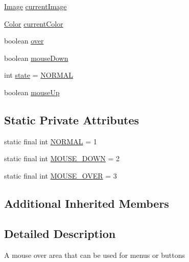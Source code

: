 \begin{DoxyCompactItemize}
\item 
\mbox{\hyperlink{classorg_1_1newdawn_1_1slick_1_1_image}{Image}} \mbox{\hyperlink{classorg_1_1newdawn_1_1slick_1_1gui_1_1_mouse_over_area_a4f8987c2e1bbc501ae63b3e8bd0d9777}{current\+Image}}
\item 
\mbox{\hyperlink{classorg_1_1newdawn_1_1slick_1_1_color}{Color}} \mbox{\hyperlink{classorg_1_1newdawn_1_1slick_1_1gui_1_1_mouse_over_area_a57b4335d9de8d2c3051689c9e0f69173}{current\+Color}}
\item 
boolean \mbox{\hyperlink{classorg_1_1newdawn_1_1slick_1_1gui_1_1_mouse_over_area_ac71b080e2b87f755f6e0fb54983877b1}{over}}
\item 
boolean \mbox{\hyperlink{classorg_1_1newdawn_1_1slick_1_1gui_1_1_mouse_over_area_ad1eb1ead0d2c6b907c4b4d4a297da2c0}{mouse\+Down}}
\item 
int \mbox{\hyperlink{classorg_1_1newdawn_1_1slick_1_1gui_1_1_mouse_over_area_afdec7c9ac6811ff02b1c51cc35da4a41}{state}} = \mbox{\hyperlink{classorg_1_1newdawn_1_1slick_1_1gui_1_1_mouse_over_area_a807ff20c977a970752b65cf6bd22d509}{N\+O\+R\+M\+AL}}
\item 
boolean \mbox{\hyperlink{classorg_1_1newdawn_1_1slick_1_1gui_1_1_mouse_over_area_a09d66a79c4523c9b230be218bba9f080}{mouse\+Up}}
\end{DoxyCompactItemize}
\subsection*{Static Private Attributes}
\begin{DoxyCompactItemize}
\item 
static final int \mbox{\hyperlink{classorg_1_1newdawn_1_1slick_1_1gui_1_1_mouse_over_area_a807ff20c977a970752b65cf6bd22d509}{N\+O\+R\+M\+AL}} = 1
\item 
static final int \mbox{\hyperlink{classorg_1_1newdawn_1_1slick_1_1gui_1_1_mouse_over_area_a2246453fdbc61f66bb16a501b70d12e4}{M\+O\+U\+S\+E\+\_\+\+D\+O\+WN}} = 2
\item 
static final int \mbox{\hyperlink{classorg_1_1newdawn_1_1slick_1_1gui_1_1_mouse_over_area_a8565884b79f0f79cccaeaf2d862f7dae}{M\+O\+U\+S\+E\+\_\+\+O\+V\+ER}} = 3
\end{DoxyCompactItemize}
\subsection*{Additional Inherited Members}


\subsection{Detailed Description}
A mouse over area that can be used for menus or buttons


